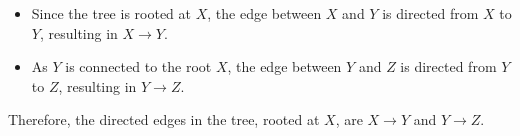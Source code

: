\documentclass[a4paper]{article}
\theoremstyle{definition}
\newenvironment{soln}{
	\leavevmode\color{blue}\ignorespaces
}{}
\begin{document}
\begin{enumerate}
\begin{soln}
		\begin{itemize}
			\item Since the tree is rooted at $X$, the edge between $X$ and $Y$ is directed from $X$ to $Y$, resulting in $X \rightarrow Y$.
			\item As $Y$ is connected to the root $X$, the edge between $Y$ and $Z$ is directed from $Y$ to $Z$, resulting in $Y \rightarrow Z$.
		\end{itemize}

		Therefore, the directed edges in the tree, rooted at $X$, are $X \rightarrow Y$ and $Y \rightarrow Z$.

	\end{soln}
\end{enumerate}

	
	
\end{document}
